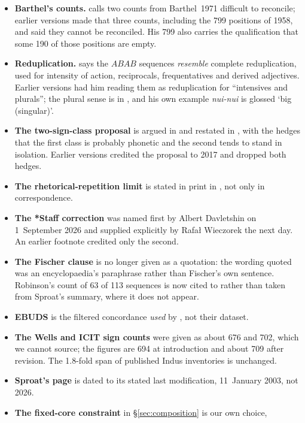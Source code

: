 \documentclass[11pt,a4paper]{article}
\begin{document}
\begin{itemize}
\item \textbf{Barthel's counts.} \citet{davletshin2017} calls two counts from
Barthel~1971 difficult to reconcile; earlier versions made that three counts,
including the 799 positions of 1958, and said they cannot be reconciled. His 799 also
carries the qualification that some 190 of those positions are empty.
\item \textbf{Reduplication.} \citet{davletshin2022} says the $ABAB$ sequences
\emph{resemble} complete reduplication, used for intensity of action, reciprocals,
frequentatives and derived adjectives. Earlier versions had him reading them as
reduplication for ``intensives and plurals''; the plural sense is in
\citet{davletshin2012}, and his own example \emph{nui-nui} is glossed `big (singular)'.
\item \textbf{The two-sign-class proposal} is argued in \citet{davletshin2012} and
restated in \citet{davletshin2017}, with the hedges that the first class is probably
phonetic and the second tends to stand in isolation. Earlier versions credited the
proposal to 2017 and dropped both hedges.
\item \textbf{The rhetorical-repetition limit} is stated in print in
\citet{davletshin2022}, not only in correspondence.
\item \textbf{The *Staff correction} was named first by Albert Davletshin on
1~September 2026 and supplied explicitly by Rafa\l{} Wieczorek the next day. An
earlier footnote credited only the second.
\item \textbf{The Fischer clause} is no longer given as a quotation: the wording
quoted was an encyclopaedia's paraphrase rather than Fischer's own sentence.
Robinson's count of 63 of 113 sequences is now cited to \citet{robinson2002} rather
than taken from Sproat's summary, where it does not appear.
\item \textbf{EBUDS} is the filtered concordance \emph{used} by \citet{rao2009}, not
their dataset.
\item \textbf{The Wells and ICIT sign counts} were given as about 676 and 702, which
we cannot source; the figures are 694 at introduction and about 709 after revision.
The 1.8-fold span of published Indus inventories is unchanged.
\item \textbf{Sproat's page} is dated to its stated last modification, 11~January
2003, not 2026.
\item \textbf{The fixed-core constraint} in \S\ref{sec:composition} is our own choice,

\end{itemize}
\end{document}
